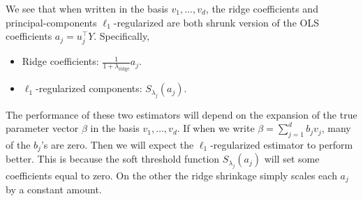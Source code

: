 \begin{enumerate}[label = (\alph*)]
    We see that when written in the basis $v_1,\ldots,v_d$, the ridge coefficients and principal-components $\ell_1$-regularized are both shrunk version of the OLS coefficients $a_j = u_j^\top Y$. Specifically, 
    \begin{itemize}
        \item Ridge coefficients: $\frac{1}{1+\lambda_{\mathrm{ridge}}} a_j$.
        \item $\ell_1$-regularized components: $S_{\lambda_j}(a_j)$.
    \end{itemize}
    The performance of these two estimators will depend on the expansion of the true parameter vector $\beta$ in the basis $v_1,\ldots,v_d$. If when we write $\beta = \sum_{j=1}^d b_jv_j$, many of the $b_j$'s are zero. Then we will expect the $\ell_1$-regularized estimator to perform better. This is because the soft threshold function $S_{\lambda_j}(a_j)$ will set some coefficients equal to zero. On the other the ridge shrinkage simply scales each $a_j$ by a constant amount. 
\end{enumerate}
